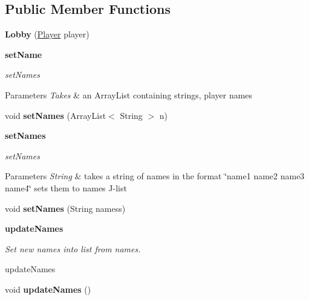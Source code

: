 \subsection*{Public Member Functions}
\begin{DoxyCompactItemize}
\item 
\hypertarget{classbattleship_1_1screen_1_1Lobby_ad1eb7059fddf6d830ab4ec791b951d07}{}{\bfseries Lobby} (\hyperlink{classbattleship_1_1game_1_1Player}{Player} player)\label{classbattleship_1_1screen_1_1Lobby_ad1eb7059fddf6d830ab4ec791b951d07}

\end{DoxyCompactItemize}
\begin{Indent}{\bf set\+Name}\par
{\em set\+Names


\begin{DoxyParams}{Parameters}
{\em Takes} & an Array\+List containing strings, player names \\
\hline
\end{DoxyParams}
}\begin{DoxyCompactItemize}
\item 
\hypertarget{classbattleship_1_1screen_1_1Lobby_aef8f388184b6dba0891c4968c4ea3ecb}{}void {\bfseries set\+Names} (Array\+List$<$ String $>$ n)\label{classbattleship_1_1screen_1_1Lobby_aef8f388184b6dba0891c4968c4ea3ecb}

\end{DoxyCompactItemize}
\end{Indent}
\begin{Indent}{\bf set\+Names}\par
{\em set\+Names


\begin{DoxyParams}{Parameters}
{\em String} & takes a string of names in the format \char`\"{}name1 name2 name3 name4\char`\"{} sets them to names J-\/list \\
\hline
\end{DoxyParams}
}\begin{DoxyCompactItemize}
\item 
\hypertarget{classbattleship_1_1screen_1_1Lobby_a5f9cf1748085cd0f971d6d0eeab7fb28}{}void {\bfseries set\+Names} (String namess)\label{classbattleship_1_1screen_1_1Lobby_a5f9cf1748085cd0f971d6d0eeab7fb28}

\end{DoxyCompactItemize}
\end{Indent}
\begin{Indent}{\bf update\+Names}\par
{\em Set new names into list from names.

update\+Names }\begin{DoxyCompactItemize}
\item 
\hypertarget{classbattleship_1_1screen_1_1Lobby_af98c5cc280db1c15700b920ac9fd7b99}{}void {\bfseries update\+Names} ()\label{classbattleship_1_1screen_1_1Lobby_af98c5cc280db1c15700b920ac9fd7b99}

\end{DoxyCompactItemize}
\end{Indent}



